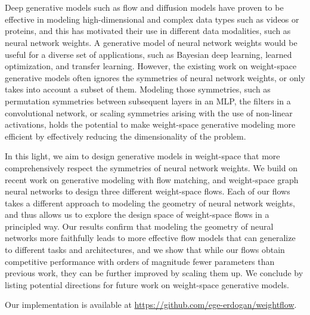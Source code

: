 \chapter{\abstractname}

Deep generative models such as flow and diffusion models have proven to be effective in modeling high-dimensional and complex data types such as videos or proteins, and this has motivated their use in different data modalities, such as neural network weights. A generative model of neural network weights would be useful for a diverse set of applications, such as Bayesian deep learning, learned optimization, and transfer learning. However, the existing work on weight-space generative models often ignores the symmetries of neural network weights, or only takes into account a subset of them. Modeling those symmetries, such as permutation symmetries between subsequent layers in an MLP, the filters in a convolutional network, or scaling symmetries arising with the use of non-linear activations, holds the potential to make weight-space generative modeling more efficient by effectively reducing the dimensionality of the problem. 

In this light, we aim to design generative models in weight-space that more comprehensively respect the symmetries of neural network weights. We build on recent work on generative modeling with flow matching, and weight-space graph neural networks to design three different weight-space flows. Each of our flows takes a different approach to modeling the geometry of neural network weights, and thus allows us to explore the design space of weight-space flows in a principled way. Our results confirm that modeling the geometry of neural networks more faithfully leads to more effective flow models that can generalize to different tasks and architectures, and we show that while our flows obtain competitive performance with orders of magnitude fewer parameters than previous work, they can be further improved by scaling them up. We conclude by listing potential directions for future work on weight-space generative models.

Our implementation is available at \url{https://github.com/ege-erdogan/weightflow}.